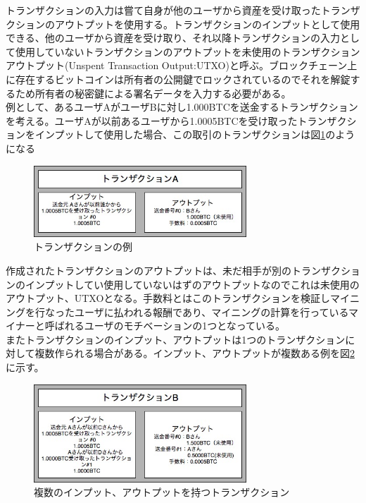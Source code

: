 \documentclass[12pt]{jarticle}
\begin{document}
トランザクションの入力は嘗て自身が他のユーザから資産を受け取ったトランザクションのアウトプットを使用する。トランザクションのインプットとして使用できる、他のユーザから資産を受け取り、それ以降トランザクションの入力として使用していないトランザクションのアウトプットを未使用のトランザクションアウトプット(Unspent Transaction Output:UTXO)と呼ぶ。ブロックチェーン上に存在するビットコインは所有者の公開鍵でロックされているのでそれを解錠するため所有者の秘密鍵による署名データを入力する必要がある。
\\
例として、あるユーザAがユーザBに対し1.000BTCを送金するトランザクションを考える。ユーザAが以前あるユーザから1.0005BTCを受け取ったトランザクションをインプットして使用した場合、この取引のトランザクションは図\ref{txex}のようになる

\begin{figure}[h]
 \centering
   \includegraphics[width=80mm]{figures/txex1.jpg}
 \caption{トランザクションの例}
 \label{txex}
\end{figure}

作成されたトランザクションのアウトプットは、未だ相手が別のトランザクションのインプットしてい使用していないはずのアウトプットなのでこれは未使用のアウトプット、UTXOとなる。手数料とはこのトランザクションを検証しマイニングを行なったユーザに払われる報酬であり、マイニングの計算を行っているマイナーと呼ばれるユーザのモチベーションの1つとなっている。
\\
またトランザクションのインプット、アウトプットは1つのトランザクションに対して複数作られる場合がある。インプット、アウトプットが複数ある例を図\ref{txex2}に示す。

\begin{figure}[h]
 \centering
   \includegraphics[width=80mm]{figures/txex2.jpg}
 \caption{複数のインプット、アウトプットを持つトランザクション}
 \label{txex2}
\end{figure}
\end{document}
